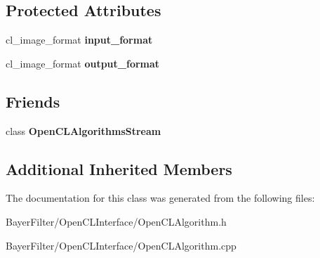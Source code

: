 \subsection*{Protected Attributes}
\begin{DoxyCompactItemize}
\item 
\hypertarget{class_open_c_l_image_algorithm_a3ce684a8c301b4a3a271ae49e847d05a}{cl\-\_\-image\-\_\-format {\bfseries input\-\_\-format}}\label{class_open_c_l_image_algorithm_a3ce684a8c301b4a3a271ae49e847d05a}

\item 
\hypertarget{class_open_c_l_image_algorithm_a7b9f51e3cbbf996f1df45111ec2b24f5}{cl\-\_\-image\-\_\-format {\bfseries output\-\_\-format}}\label{class_open_c_l_image_algorithm_a7b9f51e3cbbf996f1df45111ec2b24f5}

\end{DoxyCompactItemize}
\subsection*{Friends}
\begin{DoxyCompactItemize}
\item 
\hypertarget{class_open_c_l_image_algorithm_a5c3fcf4a82f48cdd4514b61ad7034da1}{class {\bfseries Open\-C\-L\-Algorithms\-Stream}}\label{class_open_c_l_image_algorithm_a5c3fcf4a82f48cdd4514b61ad7034da1}

\end{DoxyCompactItemize}
\subsection*{Additional Inherited Members}


The documentation for this class was generated from the following files\-:\begin{DoxyCompactItemize}
\item 
Bayer\-Filter/\-Open\-C\-L\-Interface/Open\-C\-L\-Algorithm.\-h\item 
Bayer\-Filter/\-Open\-C\-L\-Interface/Open\-C\-L\-Algorithm.\-cpp\end{DoxyCompactItemize}
